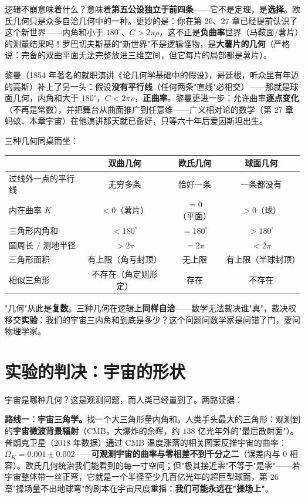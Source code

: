 逻辑不崩意味着什么？意味着\textbf{第五公设独立于前四条}——它不是定理，是\textbf{选择}。欧氏几何只是众多自洽几何中的一种。更妙的是：你在第 26、27 章已经提前认识了这个新世界——内角和小于 $180^\circ$、$C > 2\pi\rho$，这不正是\textbf{负曲率}世界（马鞍面/薯片）的测量结果吗！罗巴切夫斯基的"新世界"不是逻辑怪物，是\textbf{大薯片的几何}（严格说：完备的双曲平面无法完整放进三维空间，但它每片的局部都是薯片）。

黎曼（1854 年著名的就职演讲《论几何学基础中的假设》，哥廷根，听众里有年迈的高斯）补上了另一头：假设\textbf{没有平行线}（任何两条"直线"必相交）——那就是球面几何，内角和大于 $180^\circ$，$C < 2\pi\rho$，\textbf{正曲率}。黎曼更进一步：允许曲率\textbf{逐点变化}（不再是常数），并把舞台从曲面推广到任意维——广义相对论的数学（第 27 章蚂蚁、本章宇宙）在他演讲那天就已备好，只等六十年后爱因斯坦出生。

三种几何同桌而坐：

\begin{center}
\begin{tabular}{lccc}
\toprule
 & 双曲几何 & 欧氏几何 & 球面几何 \\
\midrule
过线外一点的平行线 & 无穷多条 & 恰好一条 & 一条都没有 \\
内在曲率 $K$ & $<0$（薯片） & $=0$（平面） & $>0$（球） \\
三角形内角和 & $<180^\circ$ & $=180^\circ$ & $>180^\circ$ \\
圆周长 $/$ 测地半径 & $>2\pi$ & $=2\pi$ & $<2\pi$ \\
三角形面积 & 有上限（角亏封顶） & 无上限 & 有上限（半球封顶） \\
相似三角形 & 不存在（角定则形定） & 存在 & 不存在 \\
\bottomrule
\end{tabular}
\end{center}

\begin{faming}
"几何"从此是\textbf{复数}。三种几何在逻辑上\textbf{同样自洽}——数学无法裁决谁"真"，裁决权移交\textbf{实验}：我们的宇宙三内角和到底是多少？这个问题问数学家是问错了门，要问物理学家。
\end{faming}

\section{实验的判决：宇宙的形状}

宇宙是哪种几何？这是观测问题，而人类已经量到了。两路证据：

\textbf{路线一：宇宙三角学。}找一个大三角形量内角和。人类手头最大的三角形：观测到的\textbf{宇宙微波背景辐射}（CMB，大爆炸的余晖，约 $138$ 亿光年外的"最后散射面"）。普朗克卫星（2018 年数据）通过 CMB 温度涨落的相关图案反推宇宙的曲率：$\Omega_K = 0.001 \pm 0.002$——\textbf{可观测宇宙的曲率与零相差不到千分之二}（误差内与 $0$ 相容）。欧氏几何统治我们能看到的每一寸空间；但"极其接近零"不等于"是零"——若宇宙整体带一丝正弯，它就是一个半径至少几百亿光年的超巨型球面，第 26 章"操场量不出地球弯"的剧本在宇宙尺度重播：\textbf{我们可能永远在"操场上"}。

